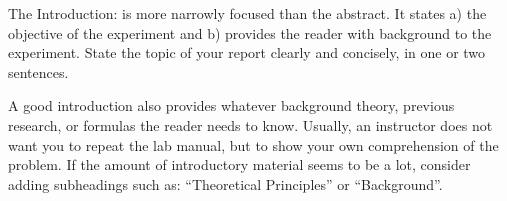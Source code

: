 The Introduction: is more narrowly focused 
than the abstract.
It states 
a) the objective of the experiment and 
b) provides the reader with background to the experiment.
State the topic of your report clearly and concisely, in one or two sentences.

A good introduction also provides whatever 
background theory, previous research, or formulas 
the reader needs to know.
Usually, an instructor does not want you to repeat the lab manual, but to show your own comprehension of the problem.
If the amount of introductory material seems to be a lot, consider adding subheadings such as: ``Theoretical Principles'' or ``Background''.